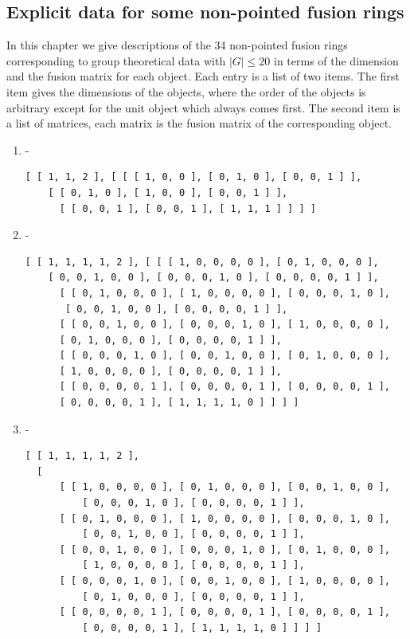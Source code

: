\documentclass[a4paper, 10pt]{book}
\theoremstyle{definition}
\numberwithin{equation}{chapter}
\begin{document}
\begin{appendices}
\chapter{Explicit data for some non-pointed fusion rings}\label{ringdata}
In this chapter we give descriptions of the 34 non-pointed fusion rings corresponding to group theoretical data with $|G|\leq 20$ in terms of the dimension and the fusion matrix for each object. Each entry is a list of two items. The first item gives the dimensions of the objects, where the order of the objects is arbitrary except for the unit object which always comes first. The second item is a list of matrices, each matrix is the fusion matrix of the corresponding object.
\begin{enumerate}
	\item -
	\begin{lstlisting}[numbers=none]
	[ [ 1, 1, 2 ], [ [ [ 1, 0, 0 ], [ 0, 1, 0 ], [ 0, 0, 1 ] ], 
	[ [ 0, 1, 0 ], [ 1, 0, 0 ], [ 0, 0, 1 ] ], 
      [ [ 0, 0, 1 ], [ 0, 0, 1 ], [ 1, 1, 1 ] ] ] ]
	\end{lstlisting}
	\item -
	\begin{lstlisting}[numbers=none]
	[ [ 1, 1, 1, 1, 2 ], [ [ [ 1, 0, 0, 0, 0 ], [ 0, 1, 0, 0, 0 ], 
	[ 0, 0, 1, 0, 0 ], [ 0, 0, 0, 1, 0 ], [ 0, 0, 0, 0, 1 ] ], 
      [ [ 0, 1, 0, 0, 0 ], [ 1, 0, 0, 0, 0 ], [ 0, 0, 0, 1, 0 ],
       [ 0, 0, 1, 0, 0 ], [ 0, 0, 0, 0, 1 ] ], 
      [ [ 0, 0, 1, 0, 0 ], [ 0, 0, 0, 1, 0 ], [ 1, 0, 0, 0, 0 ], 
      [ 0, 1, 0, 0, 0 ], [ 0, 0, 0, 0, 1 ] ], 
      [ [ 0, 0, 0, 1, 0 ], [ 0, 0, 1, 0, 0 ], [ 0, 1, 0, 0, 0 ], 
      [ 1, 0, 0, 0, 0 ], [ 0, 0, 0, 0, 1 ] ], 
      [ [ 0, 0, 0, 0, 1 ], [ 0, 0, 0, 0, 1 ], [ 0, 0, 0, 0, 1 ], 
      [ 0, 0, 0, 0, 1 ], [ 1, 1, 1, 1, 0 ] ] ] ]
	\end{lstlisting} 
	\item -
	\begin{lstlisting}[numbers=none]
	[ [ 1, 1, 1, 1, 2 ], 
  [ 
      [ [ 1, 0, 0, 0, 0 ], [ 0, 1, 0, 0, 0 ], [ 0, 0, 1, 0, 0 ], 
          [ 0, 0, 0, 1, 0 ], [ 0, 0, 0, 0, 1 ] ], 
      [ [ 0, 1, 0, 0, 0 ], [ 1, 0, 0, 0, 0 ], [ 0, 0, 0, 1, 0 ], 
          [ 0, 0, 1, 0, 0 ], [ 0, 0, 0, 0, 1 ] ], 
      [ [ 0, 0, 1, 0, 0 ], [ 0, 0, 0, 1, 0 ], [ 0, 1, 0, 0, 0 ], 
          [ 1, 0, 0, 0, 0 ], [ 0, 0, 0, 0, 1 ] ], 
      [ [ 0, 0, 0, 1, 0 ], [ 0, 0, 1, 0, 0 ], [ 1, 0, 0, 0, 0 ], 
          [ 0, 1, 0, 0, 0 ], [ 0, 0, 0, 0, 1 ] ], 
      [ [ 0, 0, 0, 0, 1 ], [ 0, 0, 0, 0, 1 ], [ 0, 0, 0, 0, 1 ], 
          [ 0, 0, 0, 0, 1 ], [ 1, 1, 1, 1, 0 ] ] ] ]


\end{lstlisting}
\end{enumerate}
\end{appendices}
\end{document}
